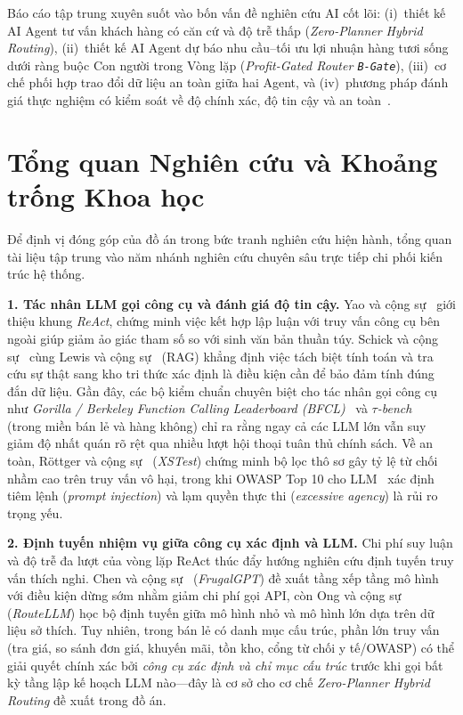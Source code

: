 Báo cáo tập trung xuyên suốt vào bốn vấn đề nghiên cứu AI cốt lõi: (i)~thiết kế AI Agent tư vấn khách hàng có căn cứ và độ trễ thấp (\emph{Zero-Planner Hybrid Routing}), (ii)~thiết kế AI Agent dự báo nhu cầu--tối ưu lợi nhuận hàng tươi sống dưới ràng buộc Con người trong Vòng lặp (\emph{Profit-Gated Router \texttt{B-Gate}}), (iii)~cơ chế phối hợp trao đổi dữ liệu an toàn giữa hai Agent, và (iv)~phương pháp đánh giá thực nghiệm có kiểm soát về độ chính xác, độ tin cậy và an toàn~\cite{retail_ai_repo,ops_chest_repo,ops_retail_bridge_repo}.

\section{Tổng quan Nghiên cứu và Khoảng trống Khoa học}

Để định vị đóng góp của đồ án trong bức tranh nghiên cứu hiện hành, tổng quan tài liệu tập trung vào năm nhánh nghiên cứu chuyên sâu trực tiếp chi phối kiến trúc hệ thống.

\textbf{1. Tác nhân LLM gọi công cụ và đánh giá độ tin cậy.}
Yao và cộng sự~\cite{yao2023react} giới thiệu khung \emph{ReAct}, chứng minh việc kết hợp lập luận với truy vấn công cụ bên ngoài giúp giảm ảo giác tham số so với sinh văn bản thuần túy. Schick và cộng sự~\cite{schick2023toolformer} cùng Lewis và cộng sự~\cite{lewis2020rag} (RAG) khẳng định việc tách biệt tính toán và tra cứu sự thật sang kho tri thức xác định là điều kiện cần để bảo đảm tính đúng đắn dữ liệu. Gần đây, các bộ kiểm chuẩn chuyên biệt cho tác nhân gọi công cụ như \emph{Gorilla / Berkeley Function Calling Leaderboard (BFCL)}~\cite{patil2024gorilla} và \emph{$\tau$-bench}~\cite{yao2024taubench} (trong miền bán lẻ và hàng không) chỉ ra rằng ngay cả các LLM lớn vẫn suy giảm độ nhất quán rõ rệt qua nhiều lượt hội thoại tuân thủ chính sách. Về an toàn, Röttger và cộng sự~\cite{rottger2024xstest} (\emph{XSTest}) chứng minh bộ lọc thô sơ gây tỷ lệ từ chối nhầm cao trên truy vấn vô hại, trong khi OWASP Top 10 cho LLM~\cite{owasp_llm} xác định tiêm lệnh (\emph{prompt injection}) và lạm quyền thực thi (\emph{excessive agency}) là rủi ro trọng yếu.

\textbf{2. Định tuyến nhiệm vụ giữa công cụ xác định và LLM.}
Chi phí suy luận và độ trễ đa lượt của vòng lặp ReAct thúc đẩy hướng nghiên cứu định tuyến truy vấn thích nghi. Chen và cộng sự~\cite{chen2023frugalgpt} (\emph{FrugalGPT}) đề xuất tầng xếp tầng mô hình với điều kiện dừng sớm nhằm giảm chi phí gọi API, còn Ong và cộng sự~\cite{ong2024routellm} (\emph{RouteLLM}) học bộ định tuyến giữa mô hình nhỏ và mô hình lớn dựa trên dữ liệu sở thích. Tuy nhiên, trong bán lẻ có danh mục cấu trúc, phần lớn truy vấn (tra giá, so sánh đơn giá, khuyến mãi, tồn kho, cổng từ chối y tế/OWASP) có thể giải quyết chính xác bởi \emph{công cụ xác định và chỉ mục cấu trúc} trước khi gọi bất kỳ tầng lập kế hoạch LLM nào---đây là cơ sở cho cơ chế \emph{Zero-Planner Hybrid Routing} đề xuất trong đồ án.

